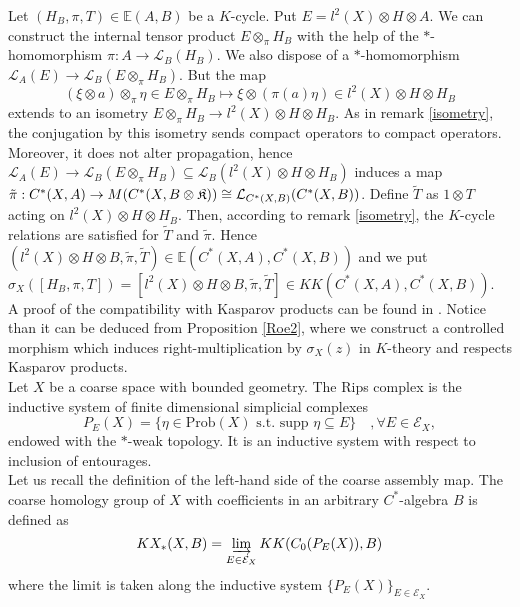 Let $(H_B,\pi,T)\in\mathbb E(A,B)$ be a $K$-cycle. Put $E = l^2(X)\otimes H\otimes A$. We can construct the internal tensor product  $E\otimes_\pi H_B$ with the help of the $*$-homomorphism $\pi : A \rightarrow \mathcal L_B(H_B)$. We also dispose of a $*$-homomorphism $\mathcal L_A(E)\rightarrow \mathcal L_B(E\otimes_\pi H_B)$. But the map 
\[(\xi\otimes a)\otimes_\pi \eta \in E\otimes_\pi H_B \mapsto \xi\otimes (\pi(a)\eta)\in l^2(X)\otimes H\otimes H_B \] %
extends to an isometry $E\otimes_\pi H_B \rightarrow l^2(X)\otimes H\otimes  H_B$. As in remark \ref{isometry}, the conjugation by this isometry sends compact operators to compact operators. Moreover, it does not alter propagation, hence $\mathcal L_A(E)\rightarrow \mathcal L_B(E\otimes_\pi H_B)\subseteq \mathcal L_B(l^2(X)\otimes H\otimes H_B)$ induces a map $\tilde \pi : C^*(X,A)\rightarrow \mathcal \mathcal M(C^*(X,B\otimes\mathfrak K))\cong \mathcal L_{C^*(X,B)}(C^*(X,B))$. Define $\tilde T$ as $1\otimes T$ acting on $l^2(X)\otimes H \otimes H_B$. Then, according to remark \ref{isometry}, the $K$-cycle relations are satisfied for $\tilde T$ and $\tilde \pi$. Hence $(l^2(X)\otimes H\otimes B,\tilde \pi,\tilde T)\in \mathbb E(C^*(X,A),C^*(X,B))$ and we put $\sigma_X([H_B,\pi,T])=[l^2(X)\otimes H\otimes B,\tilde \pi,\tilde T]\in KK(C^*(X,A),C^*(X,B))$.\\

A proof of the compatibility with Kasparov products can be found in \cite{OY3}. Notice than it can be deduced from Proposition \ref{Roe2}, where we construct a controlled morphism which induces right-multiplication by $\sigma_X(z)$ in $K$-theory and respects Kasparov products.\\ 

Let $X$ be a coarse space with bounded geometry. The Rips complex is the inductive system of finite dimensional simplicial complexes
\[P_E(X)=\{\eta\in \text{Prob}(X)\text{ s.t. supp }\eta\subseteq E\}\quad,\forall E\in \mathcal E_X,\]
endowed with the $*$-weak topology. It is an inductive system with respect to inclusion of entourages.\\
 
Let us recall the definition of the left-hand side of the coarse assembly map. The coarse homology group of $X$ with coefficients in an arbitrary $C^*$-algebra $B$ is defined as 
\[KX_*(X,B)=\varinjlim_{E\in \mathcal E_X} KK(C_0(P_E(X)),B)\]
where the limit is taken along the inductive system $\{P_E(X)\}_{E\in\mathcal E_X}$. \\

